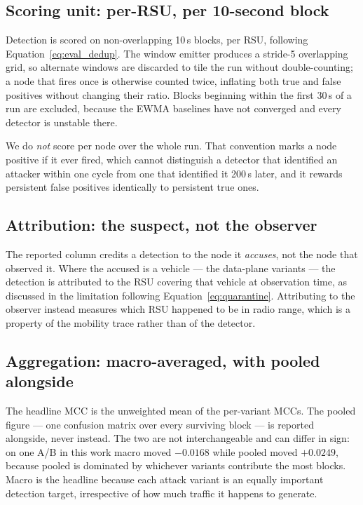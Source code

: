 \documentclass[12pt, a4paper]{report}
\begin{document}
{{\subsection{Scoring unit: per-\ac{RSU}, per 10-second block}
Detection is scored on non-overlapping 10\,s blocks, per \ac{RSU}, following
Equation~\eqref{eq:eval_dedup}. The window emitter produces a stride-5
overlapping grid, so alternate windows are discarded to tile the run without
double-counting; a node that fires once is otherwise counted twice, inflating
both true and false positives without changing their ratio. Blocks beginning
within the first 30\,s of a run are excluded, because the \ac{EWMA} baselines
have not converged and every detector is unstable there.

We do \emph{not} score per node over the whole run. That convention marks a node
positive if it ever fired, which cannot distinguish a detector that identified an
attacker within one cycle from one that identified it 200\,s later, and it
rewards persistent false positives identically to persistent true ones.

\subsection{Attribution: the suspect, not the observer}
The reported column credits a detection to the node it \emph{accuses}, not the
node that observed it. Where the accused is a vehicle --- the data-plane
variants --- the detection is attributed to the \ac{RSU} covering that vehicle at
observation time, as discussed in the limitation following
Equation~\eqref{eq:quarantine}. Attributing to the observer instead measures
which \ac{RSU} happened to be in radio range, which is a property of the mobility
trace rather than of the detector.

\subsection{Aggregation: macro-averaged, with pooled alongside}
The headline \ac{MCC} is the unweighted mean of the per-variant \ac{MCC}s. The
pooled figure --- one confusion matrix over every surviving block --- is reported
alongside, never instead. The two are not interchangeable and can differ in
sign: on one A/B in this work macro moved $-0.0168$ while pooled moved
$+0.0249$, because pooled is dominated by whichever variants contribute the most
blocks. Macro is the headline because each attack variant is an equally
important detection target, irrespective of how much traffic it happens to
generate.

}}
\end{document}
